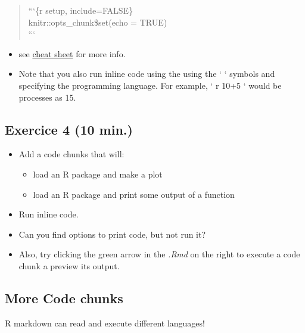 \documentclass[]{article}
\providecommand{\tightlist}{%
  \setlength{\itemsep}{0pt}\setlength{\parskip}{0pt}}
\begin{document}
\begin{quote}
```\{r setup, include=FALSE\}\\
knitr::opts\_chunk\$set(echo = TRUE)\\
```
\end{quote}

\begin{itemize}
\item
  see
  \href{https://www.rstudio.com/wp-content/uploads/2015/02/rmarkdown-cheatsheet.pdf}{cheat
  sheet} for more info.
\item
  Note that you also run inline code using the using the ` ` symbols and
  specifying the programming language. For example, ` r 10+5 ` would be
  processes as 15.
\end{itemize}

\hypertarget{exercice-4-10-min.}{%
\subsection{Exercice 4 (10 min.)}\label{exercice-4-10-min.}}

\begin{itemize}
\tightlist
\item
  Add a code chunks that will:

  \begin{itemize}
  \tightlist
  \item
    load an R package and make a plot\\
  \item
    load an R package and print some output of a function\\
  \end{itemize}
\item
  Run inline code.\\
\item
  Can you find options to print code, but not run it?\\
\item
  Also, try clicking the green arrow in the \emph{.Rmd} on the right to
  execute a code chunk a preview its output.
\end{itemize}

\hypertarget{more-code-chunks}{%
\subsection{More Code chunks}\label{more-code-chunks}}

R markdown can read and execute different languages!
\end{document}
